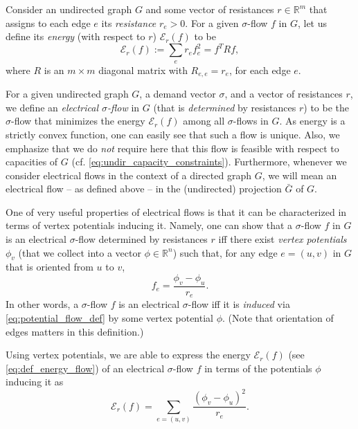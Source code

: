 \documentclass[11pt, letterpaper]{article}
\newcommand{\bbR}{\mathbb{R}}
\newcommand{\oG}{\bar{G}}
\newcommand{\energy}[2]{\mathcal{E}_{#1}(#2)}
\newcommand{\vphi}{\boldsymbol{\mathit{\phi}}}
\newcommand{\vsigma}{\boldsymbol{\mathit{\sigma}}}
\newcommand{\ff}{\boldsymbol{\mathit{f}}}
\newcommand{\rr}{\boldsymbol{\mathit{r}}}
\newcommand{\RR}{\boldsymbol{\mathit{R}}}
\begin{document}
Consider an undirected graph $G$ and some vector of resistances $\rr\in \bbR^{m}$ that assigns to each edge $e$ its {\em resistance} $r_e>0$. For a given $\vsigma$-flow $\ff$ in $G$, let us define its {\em energy} (with respect to $\rr$) $\energy{\rr}{\ff}$ to be
\begin{equation}\label{eq:def_energy_flow}
\energy{\rr}{\ff}:= \sum_e r_e f_e^2 = \ff^T \RR \ff,
\end{equation}
where $\RR$ is an $m \times m$ diagonal matrix with $R_{e,e}=r_e$, for each edge $e$. 



For a given undirected graph $G$, a demand vector $\vsigma$, and a vector of resistances $\rr$, we define an {\em electrical $\vsigma$-flow} in $G$ (that is {\em determined} by resistances $\rr$) to be the $\vsigma$-flow that minimizes the energy $\energy{\rr}{\ff}$ among all $\vsigma$-flows in $G$. As energy is a strictly convex function, one can easily see that such a flow is unique. Also, we emphasize that we do \emph{not} require here that this flow is feasible with respect to capacities of $G$ (cf. \eqref{eq:undir_capacity_constraints}). Furthermore, whenever we consider electrical flows in the context of a directed graph $G$, we will mean an electrical flow -- as defined above -- in the (undirected) projection $\oG$ of $G$.  


One of very useful properties of electrical flows is that it can be characterized in terms of vertex potentials inducing it. Namely, one can show that a $\vsigma$-flow $\ff$ in $G$ is an electrical $\vsigma$-flow determined by resistances $\rr$ iff there exist {\em vertex potentials} $\phi_v$ (that we collect into a vector $\vphi\in \bbR^n$) such that, for any edge $e=(u,v)$ in $G$ that is oriented from $u$ to $v$,
\begin{equation}\label{eq:potential_flow_def}
f_e = \frac{\phi_v-\phi_u}{r_e}.
\end{equation}
In other words, a $\vsigma$-flow $\ff$ is an electrical $\vsigma$-flow iff it is {\em induced} via \eqref{eq:potential_flow_def} by some vertex potential $\vphi$. (Note that orientation of edges matters in this definition.)

Using vertex potentials, we are able to express the energy $\energy{\rr}{\ff}$ (see \eqref{eq:def_energy_flow}) of an electrical $\vsigma$-flow $\ff$ in terms of the potentials $\vphi$ inducing it as
\begin{equation}\label{eq:def_energy_potentials}
\energy{\rr}{\ff}= \sum_{e=(u,v)} \frac{(\phi_v-\phi_u)^2}{r_e}.
\end{equation}
\end{document}
